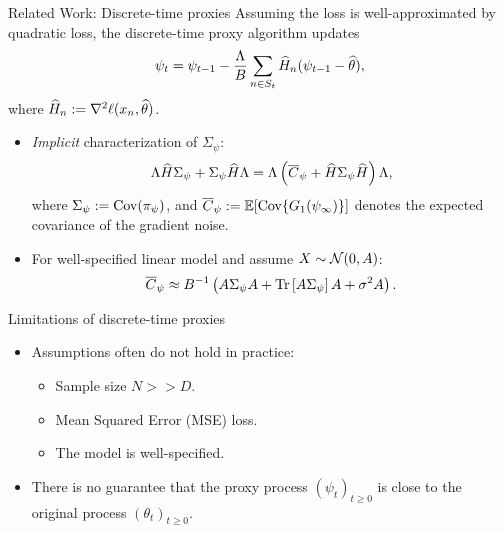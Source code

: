 \documentclass[10pt,xcolor=table]{beamer}
\begin{document}
\begin{frame}{Related Work: Discrete-time proxies}
Assuming the loss is well-approximated by quadratic loss, the discrete-time proxy algorithm updates 
\begin{equation*}
	\label{eq:discrete-time-model-general}
	\psi_{t} = \psi_{t-1} - \frac{\Lambda}{B}\sum_{n\in S_{t}} \widehat{H}_{n} (\psi_{t-1} - \widehat{\theta}),
\end{equation*}
where $\widehat{H}_{n} :=  \nabla^{2} \ell(x_{n}, \widehat{\theta})$.
\begin{itemize}
	\item \emph{Implicit} characterization of $\Sigma_{\psi}$:
	\begin{equation*}
		\Lambda \widehat{H} \Sigma_{\psi} + \Sigma_{\psi}  \widehat{H} \Lambda = \Lambda \left(\overline{C}_{\psi} + \widehat{H} \Sigma_{\psi} \widehat{H} \right)\Lambda,
		\label{eq: SGD stationary covariance}
	\end{equation*}
where $\Sigma_{\psi} := \operatorname{Cov}(\pi_{\psi})$, and $\overline{C}_{\psi} := \mathbb{E}[\operatorname{Cov}\{G_{1}(\psi_{\infty})\}]$ denotes the expected covariance of the gradient noise. 
	\item For well-specified linear model and assume $X \sim \mathcal{N}(0, A)$: 
	\begin{equation*}
		\overline{C}_{\psi} %
		\approx B^{-1} \left( A \Sigma_{\psi} A + \Tr \left[ A \Sigma_{\psi} \right]A + \sigma^{2} A \right).
		\label{eq: sgd noise in well-specified linear model}
	\end{equation*}
	
\end{itemize}
	
\end{frame}

\begin{frame}{Limitations of discrete-time proxies}
	\begin{itemize}
		\item Assumptions often do not hold in practice:
		\begin{itemize}
			\item Sample size $N >> D$.
			\item Mean Squared Error (MSE) loss.
			\item The model is well-specified. 
		\end{itemize}
		\item There is no guarantee that the proxy process $(\psi_{t})_{t \ge 0}$ is close 
		to the original process $(\theta_{t})_{t \ge 0}$.
	\end{itemize}
\end{frame}
\end{document}
